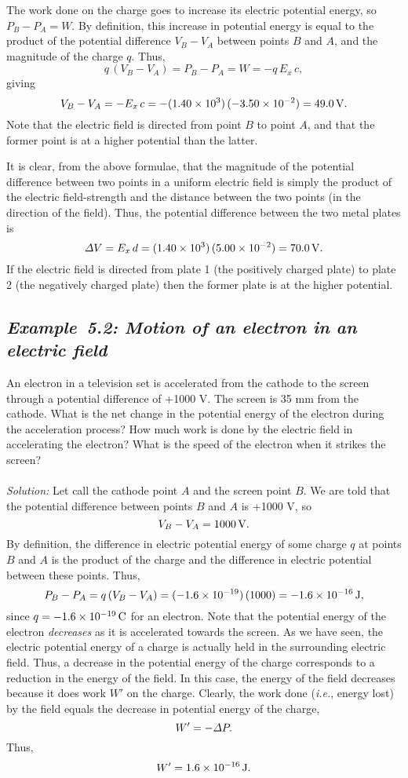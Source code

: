 The work done on the charge goes to increase its electric
potential energy, so  $P_B - P_A = W$. By definition, this increase in
potential energy is equal to the product of the potential difference
$V_B- V_A$ between points $B$ and $A$, and the magnitude of the charge $q$.
Thus,
$$
q\,(V_B- V_A)= P_B - P_A = W  = - q\,E_x\,c,
$$
giving
$$
V_B - V_A = -E_x\,c= -(1.40\times 10^3)\,(-3.50\times 10^{-2})=49.0\,{\rm V}.
$$
Note that the electric field is directed from point $B$ to point $A$, and
that the former point is  at a higher potential than the latter.

It is clear, from the above formulae, that the magnitude of the potential difference
between two points in a uniform electric field is simply the product of the
electric field-strength and the distance between the two points (in the direction
of the field). Thus, the potential difference between the two metal plates is
$$
{\mit\Delta}V = E_x\,d = (1.40\times 10^3)\,(5.00\times 10^{-2})=70.0\,{\rm V}.
$$
If the electric field is directed from plate 1 (the positively charged plate)
to plate 2 (the negatively charged plate) then the former plate is at the
higher potential. 

\subsection*{\em Example~5.2: Motion of  an electron in an electric field}
An electron in a television set is accelerated from the cathode to the
screen through a potential difference of +1000 V. The screen is 35 mm from
the cathode. What is the net change in the potential energy of the electron
during the acceleration process? 
How much work is done by the electric field in accelerating the
electron?
What is the speed of the electron when it strikes
the screen?\\
~\\
{\em Solution:} Let call the cathode point $A$ and the screen point $B$. We
are told that the potential difference between points $B$ and $A$ is +1000 V,
so 
$$
V_B - V_A = 1000\,{\rm V}.
$$
By definition, the difference in electric potential energy of some charge $q$ at
points $B$ and $A$ is the product of the charge  and
the difference in  electric potential
between these points. Thus,
$$
P_B- P_A = q\,(V_B - V_A)= (-1.6\times 10^{-19})\,(1000) = -1.6\times 10^{-16}\,{\rm J},
$$
since $q=-1.6\times 10^{-19}\,{\rm C}$ for an electron.
Note that the potential energy of the electron {\em decreases}
as it is accelerated towards the screen. As we have seen, the electric
potential energy of a charge is actually held in the surrounding electric field.
Thus, a decrease in the potential energy of the charge corresponds to a reduction in the
energy of the field. In this case, the energy of
the field decreases because it does work $W'$ on the charge. 
Clearly, the work done
 ({\em i.e.}, energy lost) by the field equals the decrease in potential energy
of the charge,
$$
W' = - {\mit\Delta}P.
$$
Thus, 
$$
W' = 1.6\times 10^{-16}\,{\rm J}.
$$

